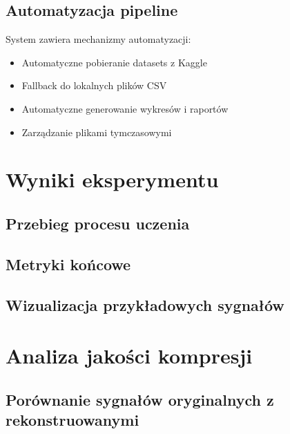 \documentclass[12pt,a4paper]{article}
\begin{document}
\subsection{Automatyzacja pipeline}

System zawiera mechanizmy automatyzacji:
\begin{itemize}
    \item Automatyczne pobieranie datasets z Kaggle
    \item Fallback do lokalnych plików CSV
    \item Automatyczne generowanie wykresów i raportów
    \item Zarządzanie plikami tymczasowymi
\end{itemize}


\section{Wyniki eksperymentu}

\subsection{Przebieg procesu uczenia}


\subsection{Metryki końcowe}


\subsection{Wizualizacja przykładowych sygnałów}


\section{Analiza jakości kompresji}

\subsection{Porównanie sygnałów oryginalnych z rekonstruowanymi}
\end{document}
